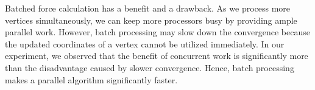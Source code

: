 \documentclass{vgtc}
\begin{document}
Batched force calculation has a benefit and a drawback. 
As we process more vertices simultaneously, we can keep more processors busy by providing ample parallel work. 
However, batch processing may slow down the convergence because the updated coordinates of a vertex cannot be utilized immediately. 
In our experiment, we observed that the benefit of concurrent work is significantly more than the disadvantage caused by slower convergence. 
Hence, batch processing makes a parallel algorithm significantly faster. 
\end{document}

